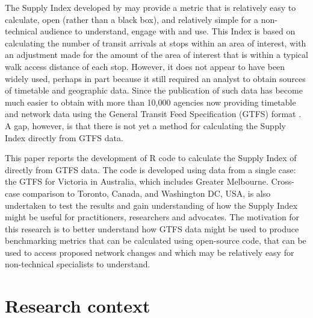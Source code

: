\documentclass[numbered]{trbunofficial}
\begin{document}
The Supply Index developed by \citet{currie2007identifying} may provide
a metric that is relatively easy to calculate, open (rather than a black
box), and relatively simple for a non-technical audience to understand,
engage with and use. This Index is based on calculating the number of
transit arrivals at stops within an area of interest, with an adjustment
made for the amount of the area of interest that is within a typical
walk access distance of each stop. However, it does not appear to have
been widely used, perhaps in part because it still required an analyst
to obtain sources of timetable and geographic data. Since the
publication of \citet{currie2007identifying} such data has become much
easier to obtain with more than 10,000 agencies now providing timetable
and network data using the General Transit Feed Specification (GTFS)
format \citep{GTFS}. A gap, however, is that there is not yet a method
for calculating the \citet{currie2007identifying} Supply Index directly
from GTFS data.

This paper reports the development of R code to calculate the Supply
Index of \citet{currie2007identifying} directly from GTFS data. The code
is developed using data from a single case: the GTFS for Victoria in
Australia, which includes Greater Melbourne. Cross-case comparison to
Toronto, Canada, and Washington DC, USA, is also undertaken to test the
results and gain understanding of how the Supply Index might be useful
for practitioners, researchers and advocates. The motivation for this
research is to better understand how GTFS data might be used to produce
benchmarking metrics that can be calculated using open-source code, that
can be used to access proposed network changes and which may be
relatively easy for non-technical specialists to understand.

\hypertarget{research-context}{%
\section{Research context}\label{research-context}}
\end{document}
